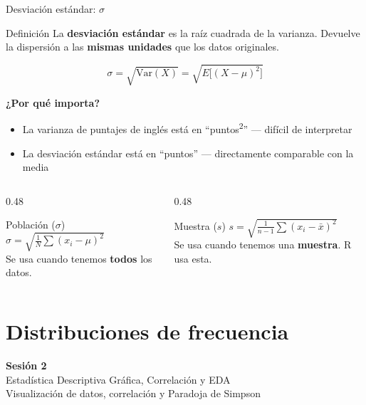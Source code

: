 \documentclass[aspectratio=169, 11pt]{beamer}
\begin{document}
\begin{frame}{Desviaci\'on est\'andar: $\sigma$}
\begin{block}{Definición}
La \textbf{desviaci\'on est\'andar} es la ra\'iz cuadrada de la varianza. Devuelve la dispersi\'on a las \textbf{mismas unidades} que los datos originales.
\end{block}

\[
\sigma = \sqrt{\text{Var}(X)} = \sqrt{E\!\big[(X-\mu)^2\big]}
\]

\textbf{¿Por qu\'e importa?}
\begin{itemize}\setlength{\itemsep}{1pt}
\item La varianza de puntajes de ingl\'es est\'a en ``puntos\textsuperscript{2}'' --- dif\'icil de interpretar
\item La desviaci\'on est\'andar est\'a en ``puntos'' --- directamente comparable con la media
\end{itemize}

\begin{columns}[T]
\begin{column}{0.48\textwidth}
\begin{alertblock}{Poblaci\'on ($\sigma$)}
$\sigma = \sqrt{\frac{1}{N}\sum(x_i - \mu)^2}$\\[2pt]
Se usa cuando tenemos \textbf{todos} los datos.
\end{alertblock}
\end{column}
\begin{column}{0.48\textwidth}
\begin{alertblock}{Muestra ($s$)}
$s = \sqrt{\frac{1}{n-1}\sum(x_i - \bar{x})^2}$\\[2pt]
Se usa cuando tenemos una \textbf{muestra}. R usa esta.
\end{alertblock}
\end{column}
\end{columns}
\end{frame}

\section{Distribuciones de frecuencia}

\begin{frame}{}
\vfill
\centering
{\Large\textbf{Sesi\'on 2}}\\[1em]
{\normalsize Estad\'istica Descriptiva Gr\'afica, Correlaci\'on y EDA}\\[0.5em]
{\small Visualizaci\'on de datos, correlaci\'on y Paradoja de Simpson}
\vfill
\end{frame}
\end{document}
